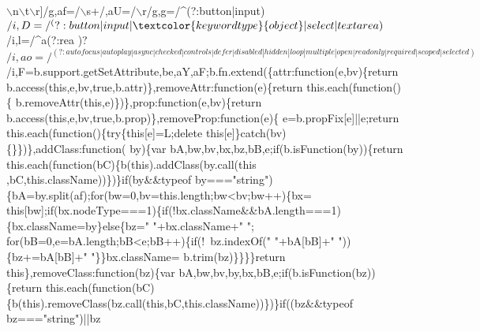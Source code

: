 \begin{DoxyCode}
      \(\backslash\)n\(\backslash\)t\(\backslash\)r]/g,af=/\(\backslash\)s+/,aU=/\(\backslash\)r/g,g=/^(?:button|input)$/i,D=/^(?:button|input|\textcolor{keywordtype}{object}|select|textarea)$/i,l=/^a(?:rea
      )?$/i,ao=/^(?:autofocus|autoplay|async|checked|controls|defer|disabled|hidden|loop|multiple|open|readonly|
      required|scoped|selected)$/i,F=b.support.getSetAttribute,be,aY,aF;b.fn.extend(\{attr:\textcolor{keyword}{function}(e,bv)\{\textcolor{keywordflow}{return} 
      b.access(\textcolor{keyword}{this},e,bv,\textcolor{keyword}{true},b.attr)\},removeAttr:\textcolor{keyword}{function}(e)\{\textcolor{keywordflow}{return} this.each(\textcolor{keyword}{function}()\{
      b.removeAttr(\textcolor{keyword}{this},e)\})\},prop:\textcolor{keyword}{function}(e,bv)\{\textcolor{keywordflow}{return} b.access(\textcolor{keyword}{this},e,bv,\textcolor{keyword}{true},b.prop)\},removeProp:\textcolor{keyword}{function}(e)\{
      e=b.propFix[e]||e;\textcolor{keywordflow}{return} this.each(\textcolor{keyword}{function}()\{\textcolor{keywordflow}{try}\{\textcolor{keyword}{this}[e]=L;\textcolor{keyword}{delete} \textcolor{keyword}{this}[e]\}\textcolor{keywordflow}{catch}(bv)\{\}\})\},addClass:\textcolor{keyword}{function}(
      by)\{var bA,bw,bv,bx,bz,bB,e;\textcolor{keywordflow}{if}(b.isFunction(by))\{\textcolor{keywordflow}{return} this.each(\textcolor{keyword}{function}(bC)\{b(\textcolor{keyword}{this}).addClass(by.call(\textcolor{keyword}{this}
      ,bC,\textcolor{keyword}{this}.className))\})\}\textcolor{keywordflow}{if}(by&&typeof by===\textcolor{stringliteral}{"string"})\{bA=by.split(af);\textcolor{keywordflow}{for}(bw=0,bv=this.length;bw<bv;bw++)\{bx=\textcolor{keyword}{
      this}[bw];\textcolor{keywordflow}{if}(bx.nodeType===1)\{\textcolor{keywordflow}{if}(!bx.className&&bA.length===1)\{bx.className=by\}\textcolor{keywordflow}{else}\{bz=\textcolor{stringliteral}{" "}+bx.className+\textcolor{stringliteral}{" "};\textcolor{keywordflow}{
      for}(bB=0,e=bA.length;bB<e;bB++)\{\textcolor{keywordflow}{if}(!~bz.indexOf(\textcolor{stringliteral}{" "}+bA[bB]+\textcolor{stringliteral}{" "}))\{bz+=bA[bB]+\textcolor{stringliteral}{" "}\}\}bx.className=
      b.trim(bz)\}\}\}\}\textcolor{keywordflow}{return} \textcolor{keyword}{this}\},removeClass:\textcolor{keyword}{function}(bz)\{var bA,bw,bv,by,bx,bB,e;\textcolor{keywordflow}{if}(b.isFunction(bz))\{\textcolor{keywordflow}{return} 
      this.each(\textcolor{keyword}{function}(bC)\{b(\textcolor{keyword}{this}).removeClass(bz.call(\textcolor{keyword}{this},bC,\textcolor{keyword}{this}.className))\})\}\textcolor{keywordflow}{if}((bz&&typeof bz===\textcolor{stringliteral}{"string"})||bz

\end{DoxyCode}
